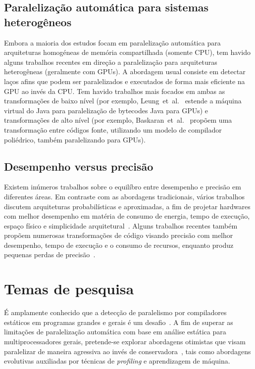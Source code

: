 \documentclass[a4paper,12pt]{article}
\newcommand{\etal}{et~al.}
\newcommand\FIXME[1]{\textcolor{red}{FIX:}\textcolor{red}{#1}}
\begin{document}
\subsection{Paralelização automática para sistemas heterogêneos}

Embora a maioria dos estudos focam em paralelização automática para arquiteturas homogéneas de memória compartilhada (somente CPU), tem havido alguns trabalhos recentes em direção a paralelização para arquiteturas heterogêneas (geralmente com GPUs). A abordagem usual consiste em detectar laços afins que podem ser paralelizados e executados de forma mais eficiente na GPU ao invés da CPU. Tem havido trabalhos mais focados em ambas as transformações de baixo nível (por exemplo, Leung~\etal~\cite{leung09} estende a máquina virtual do Java para paralelização de bytecodes Java para GPUs) e transformações de alto nível (por exemplo, Baskaran~\etal~\cite{baskaran08,baskaran10} propõem uma transformação entre códigos fonte, utilizando um modelo de compilador poliédrico, também paralelizando para GPUs).

\subsection{Desempenho versus precisão}
\label{subsec:perfvsacc}

Existem inúmeros trabalhos sobre o equilíbro entre desempenho e precisão em diferentes áreas. Em contraste com as abordagens tradicionais, vários trabalhos discutem arquiteturas probabilísticas e aproximadas, a fim de projetar hardwares com melhor desempenho em matéria de consumo de energia, tempo de execução, espaço físico e simplicidade arquitetural~\cite{palem09,palem12,lingamneni12,kirsch12}. Alguns trabalhos recentes também propõem numerosas transformações de código visando precisão com melhor desempenho, tempo de execução e o consumo de recursos, enquanto produz pequenas perdas de precisão~\cite{misailovic11,douskos11,zhu12}.

\section{Temas de pesquisa}\label{sec:research-dir}


É amplamente conhecido que a detecção de paralelismo por compiladores estáticos em programas grandes e gerais é um desafio~\cite{kennedy01,chen03}. A fim de superar as limitações de paralelização automática com base em análise estática para multiprocessadores gerais, pretende-se explorar abordagens otimistas que visam paralelizar de maneira agressiva ao invés de conservadora~\cite{chen03,williams96,williams99}, tais como abordagens evolutivas auxiliadas por técnicas de \textit{profiling} e aprendizagem de máquina.
\end{document}
